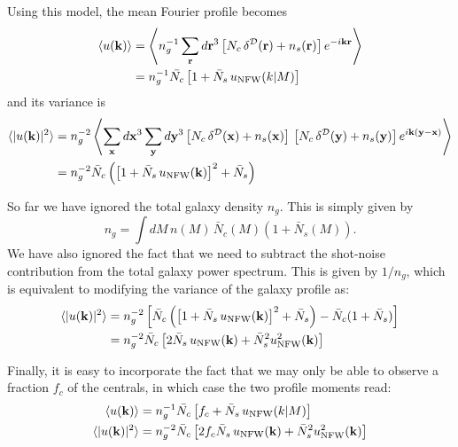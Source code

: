 \documentclass{article}
\begin{document}
    Using this model, the mean Fourier profile becomes
    \begin{align}
      \langle u({\bf k})\rangle
      &=\left\langle n_g^{-1}\sum_{\bf r} d{\bf r}^3 \left[N_c\,\delta^{\cal D}({\bf r})+n_s({\bf r})\right]e^{-i{\bf k}{\bf r}}\right\rangle\\
      &=n_g^{-1}\bar{N_c}\left[1+\bar{N}_s\,u_{\rm NFW}(k|M)\right]\\
    \end{align}
    and its variance is
    \begin{align}
      \langle |u({\bf k})|^2\rangle
      &=n_g^{-2}\left\langle \sum_{\bf x} d{\bf x}^3\sum_{\bf y} d{\bf y}^3 \left[N_c\,\delta^{\cal D}({\bf x})+n_s({\bf x})\right]\,\left[N_c\,\delta^{\cal D}({\bf y})+n_s({\bf y})\right]e^{i{\bf k}({\bf y}-{\bf x})}\right\rangle\\ 
      &=n_g^{-2}\bar{N}_c\left(\left[1+\bar{N}_s\,u_{\rm NFW}({\bf k})\right]^2+\bar{N}_s\right)
    \end{align}

    So far we have ignored the total galaxy density $n_g$. This is simply given by 
    \begin{equation}
      n_g=\int dM\,n(M)\,\bar{N}_c(M)\left(1+\bar{N}_s(M)\right).
    \end{equation}
    We have also ignored the fact that we need to subtract the shot-noise contribution from the total galaxy power spectrum. This is given by $1/n_g$, which is equivalent to modifying the variance of the galaxy profile as:
    \begin{align}
      \langle |u({\bf k})|^2\rangle
      &=n_g^{-2}\left[\bar{N}_c\left(\left[1+\bar{N}_s\,u_{\rm NFW}({\bf k})\right]^2+\bar{N}_s\right)-\bar{N}_c(1+\bar{N}_s)\right]\\
      &=n_g^{-2}\bar{N}_c\left[2\bar{N}_s\,u_{\rm NFW}({\bf k})+\bar{N}_s^2u_{\rm NFW}^2({\bf k})\right]
    \end{align}

    Finally, it is easy to incorporate the fact that we may only be able to observe a fraction $f_c$ of the centrals, in which case the two profile moments read:
    \begin{align}
      \langle u({\bf k})\rangle
      &=n_g^{-1}\bar{N_c}\left[f_c+\bar{N}_s\,u_{\rm NFW}(k|M)\right]\\
      \langle |u({\bf k})|^2\rangle
      &=n_g^{-2}\bar{N}_c\left[2f_c\bar{N}_s\,u_{\rm NFW}({\bf k})+\bar{N}_s^2u_{\rm NFW}^2({\bf k})\right]
    \end{align}
\end{document}
